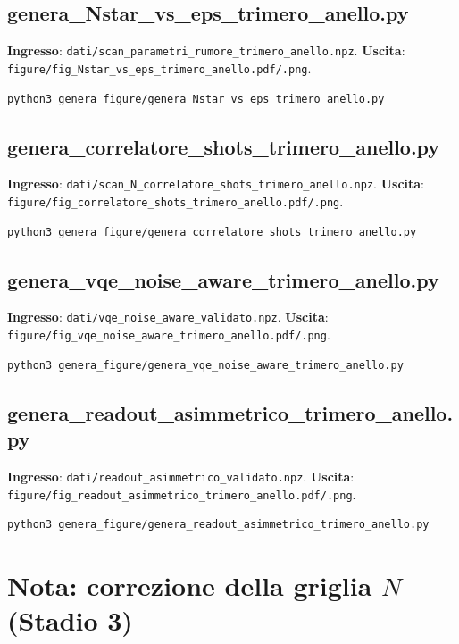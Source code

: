 \documentclass[11pt,a4paper]{article}
\begin{document}
\subsection{genera\_Nstar\_vs\_eps\_trimero\_anello.py}
\textbf{Ingresso}: \texttt{dati/scan\_parametri\_\allowbreak rumore\_trimero\_anello.npz}.
\textbf{Uscita}: \texttt{figure/fig\_Nstar\_vs\_eps\_\allowbreak trimero\_anello.pdf/.png}.
\begin{verbatim}
python3 genera_figure/genera_Nstar_vs_eps_trimero_anello.py
\end{verbatim}

\subsection{genera\_correlatore\_shots\_trimero\_anello.py}
\textbf{Ingresso}: \texttt{dati/scan\_N\_\allowbreak correlatore\_shots\_trimero\_anello.npz}.
\textbf{Uscita}: \texttt{figure/fig\_correlatore\_\allowbreak shots\_trimero\_anello.pdf/.png}.
\begin{verbatim}
python3 genera_figure/genera_correlatore_shots_trimero_anello.py
\end{verbatim}

\subsection{genera\_vqe\_noise\_aware\_trimero\_anello.py}
\textbf{Ingresso}: \texttt{dati/vqe\_noise\_aware\_\allowbreak validato.npz}.
\textbf{Uscita}: \texttt{figure/fig\_vqe\_\allowbreak noise\_aware\_trimero\_anello.pdf/.png}.
\begin{verbatim}
python3 genera_figure/genera_vqe_noise_aware_trimero_anello.py
\end{verbatim}

\subsection{genera\_readout\_asimmetrico\_trimero\_anello.py}
\textbf{Ingresso}: \texttt{dati/readout\_\allowbreak asimmetrico\_validato.npz}.
\textbf{Uscita}: \texttt{figure/fig\_readout\_\allowbreak asimmetrico\_trimero\_anello.pdf/.png}.
\begin{verbatim}
python3 genera_figure/genera_readout_asimmetrico_trimero_anello.py
\end{verbatim}

\section{Nota: correzione della griglia \texorpdfstring{$N$}{N} (Stadio 3)}
\end{document}
